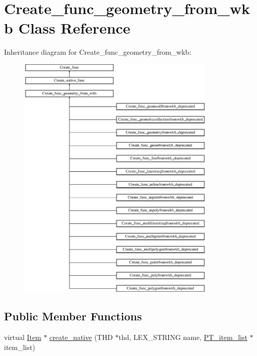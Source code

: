 \hypertarget{classCreate__func__geometry__from__wkb}{}\section{Create\+\_\+func\+\_\+geometry\+\_\+from\+\_\+wkb Class Reference}
\label{classCreate__func__geometry__from__wkb}
Inheritance diagram for Create\+\_\+func\+\_\+geometry\+\_\+from\+\_\+wkb\+:\begin{figure}[H]
\begin{center}
\leavevmode
\includegraphics[height=12.000000cm]{classCreate__func__geometry__from__wkb}
\end{center}
\end{figure}
\subsection*{Public Member Functions}
\begin{DoxyCompactItemize}
\item 
virtual \mbox{\hyperlink{classItem}{Item}} $\ast$ \mbox{\hyperlink{classCreate__func__geometry__from__wkb_a2dc1bd3f589aca8e3fcab072829d7886}{create\+\_\+native}} (T\+HD $\ast$thd, L\+E\+X\+\_\+\+S\+T\+R\+I\+NG name, \mbox{\hyperlink{classPT__item__list}{P\+T\+\_\+item\+\_\+list}} $\ast$item\+\_\+list)
\end{DoxyCompactItemize}
